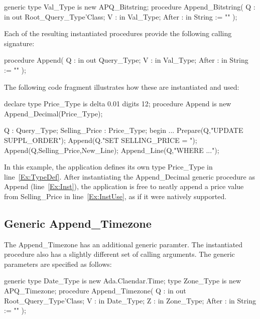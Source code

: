 \documentclass[english,letterpaper]{book}
\begin{document}
\begin{Code}
generic
   type Val_Type is new APQ_Bitstring;
procedure Append_Bitstring(
   Q :     in out Root_Query_Type'Class;
   V :     in     Val_Type;
   After : in     String := ""
);
\end{Code}

Each of the resulting instantiated procedures provide the following
calling signature:

\begin{Code}
procedure Append(
   Q :     in out Query_Type;
   V :     in     Val_Type;
   After : in     String := ""
);
\end{Code}

The following code fragment illustrates how these are instantiated and used:

\begin{NumberedExample}
declare
   type Price_Type is delta 0.01 digits 12;\label{Ex:TypeDef}
   procedure Append is new Append_Decimal(Price_Type);\label{Ex:Inst}

   Q :             Query_Type;
   Selling_Price : Price_Type;
begin
   ...
   Prepare(Q,"UPDATE SUPPL_ORDER");
   Append(Q."SET SELLING_PRICE = ");
   Append(Q,Selling_Price,New_Line);\label{Ex:InstUse}
   Append_Line(Q,"WHERE ...");
\end{NumberedExample}

In this example, the application defines its own type Price\_Type
in line~\ref{Ex:TypeDef}. After instantiating the Append\_Decimal
generic procedure as Append (line~\ref{Ex:Inst}), the application is
free to neatly append a price value from Selling\_Price in
line~\ref{Ex:InstUse}, as if it were natively supported.


\subsection{Generic Append\_Timezone}

The Append\_Timezone has an additional generic paramter. The instantiated
procedure also has a slightly different set of calling arguments. The generic
parameters are specified as follows:

\begin{Code}
generic
   type Date_Type is new Ada.Claendar.Time;
   type Zone_Type is new APQ_Timezone;
procedure Append_Timezone(
   Q :     in out Root_Query_Type'Class;
   V :     in     Date_Type;
   Z :     in     Zone_Type;
   After : in     String := ""
);
\end{Code}
\end{document}

